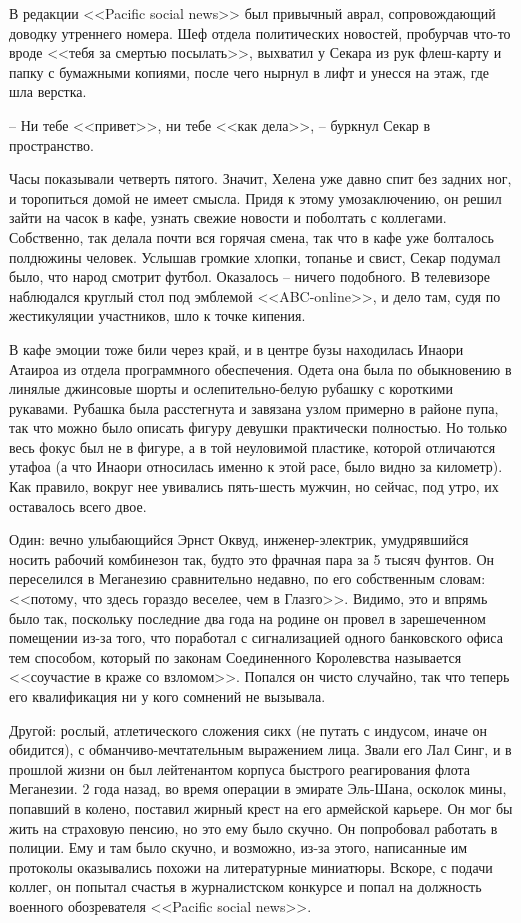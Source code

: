 В редакции <<Pacific social news>> был привычный аврал, сопровождающий доводку утреннего номера. Шеф отдела политических новостей, пробурчав что-то вроде <<тебя за смертью посылать>>, выхватил у Секара из рук флеш-карту и папку с бумажными копиями, после чего нырнул в лифт и унесся на этаж, где шла верстка.

-- Ни тебе <<привет>>, ни тебе <<как дела>>, -- буркнул Секар в пространство.

Часы показывали четверть пятого. Значит, Хелена уже давно спит без задних ног, и торопиться домой не имеет смысла. Придя к этому умозаключению, он решил зайти на часок в кафе, узнать свежие новости и поболтать с коллегами. Собственно, так делала почти вся горячая смена, так что в кафе уже болталось полдюжины человек. Услышав громкие хлопки, топанье и свист, Секар подумал было, что народ смотрит футбол. Оказалось -- ничего подобного. В телевизоре наблюдался круглый стол под эмблемой <<ABC-online>>, и дело там, судя по жестикуляции участников, шло к точке кипения.

В кафе эмоции тоже били через край, и в центре бузы находилась Инаори Атаироа из отдела программного обеспечения. Одета она была по обыкновению в линялые джинсовые шорты и ослепительно-белую рубашку с короткими рукавами. Рубашка была расстегнута и завязана узлом примерно в районе пупа, так что можно было описать фигуру девушки практически полностью. Но только весь фокус был не в фигуре, а в той неуловимой пластике, которой отличаются утафоа (а что Инаори относилась именно к этой расе, было видно за километр). Как правило, вокруг нее увивались пять-шесть мужчин, но сейчас, под утро, их оставалось всего двое.

Один: вечно улыбающийся Эрнст Оквуд, инженер-электрик, умудрявшийся носить рабочий комбинезон так, будто это фрачная пара за 5 тысяч фунтов. Он переселился в Меганезию сравнительно недавно, по его собственным словам: <<потому, что здесь гораздо веселее, чем в Глазго>>. Видимо, это и впрямь было так, поскольку последние два года на родине он провел в зарешеченном помещении из-за того, что поработал с сигнализацией одного банковского офиса тем способом, который по законам Соединенного Королевства называется <<соучастие в краже со взломом>>. Попался он чисто случайно, так что теперь его квалификация ни у кого сомнений не вызывала.

Другой: рослый, атлетического сложения сикх (не путать с индусом, иначе он обидится), с обманчиво-мечтательным выражением лица. Звали его Лал Синг, и в прошлой жизни он был лейтенантом корпуса быстрого реагирования флота Меганезии. 2 года назад, во время операции в эмирате Эль-Шана, осколок мины, попавший в колено, поставил жирный крест на его армейской карьере. Он мог бы жить на страховую пенсию, но это ему было скучно. Он попробовал работать в полиции. Ему и там было скучно, и возможно, из-за этого, написанные им протоколы оказывались похожи на литературные миниатюры. Вскоре, с подачи коллег, он попытал счастья в журналистском конкурсе и попал на должность военного обозревателя <<Pacific social news>>.

